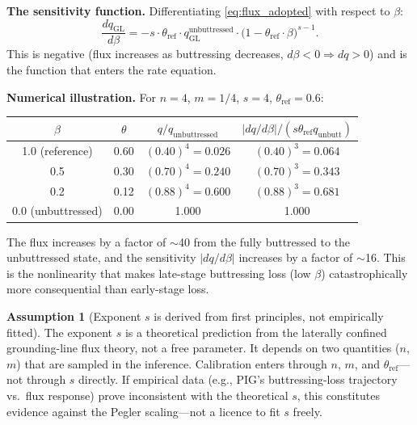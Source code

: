 \documentclass[11pt]{article}
\theoremstyle{definition}
\newtheorem{assumption}{Assumption}
\begin{document}
\textbf{The sensitivity function.}  Differentiating \cref{eq:flux_adopted} with respect to $\beta$:
\begin{equation}
  \frac{dq_{\text{GL}}}{d\beta} = -s \cdot \theta_{\text{ref}} \cdot q_\text{GL}^{\text{unbuttressed}} \cdot \bigl(1 - \theta_{\text{ref}} \cdot \beta\bigr)^{s - 1}.
  \label{eq:dq_dbeta}
\end{equation}
This is negative (flux increases as buttressing decreases, $d\beta < 0 \Rightarrow dq > 0$) and is the function that enters the rate equation.

\textbf{Numerical illustration.}  For $n = 4$, $m = 1/4$, $s = 4$, $\theta_{\text{ref}} = 0.6$:
\begin{center}
\begin{tabular}{cccc}
  \toprule
  $\beta$ & $\theta$ & $q/q_{\text{unbuttressed}}$ & $|dq/d\beta| / (s\theta_{\text{ref}} q_{\text{unbutt}})$ \\
  \midrule
  1.0 (reference) & 0.60 & $(0.40)^4 = 0.026$ & $(0.40)^3 = 0.064$ \\
  0.5 & 0.30 & $(0.70)^4 = 0.240$ & $(0.70)^3 = 0.343$ \\
  0.2 & 0.12 & $(0.88)^4 = 0.600$ & $(0.88)^3 = 0.681$ \\
  0.0 (unbuttressed) & 0.00 & 1.000 & 1.000 \\
  \bottomrule
\end{tabular}
\end{center}
The flux increases by a factor of $\sim$40 from the fully buttressed to the unbuttressed state, and the sensitivity $|dq/d\beta|$ increases by a factor of $\sim$16.  This is the nonlinearity that makes late-stage buttressing loss (low $\beta$) catastrophically more consequential than early-stage loss.

\begin{assumption}[Exponent $s$ is derived from first principles, not empirically fitted]
  \label{assump:s_theoretical}
  The exponent $s$ is a theoretical prediction from the laterally confined grounding-line flux theory, not a free parameter.  It depends on two quantities ($n$, $m$) that are sampled in the inference.  Calibration enters through $n$, $m$, and $\theta_{\text{ref}}$---not through $s$ directly.  If empirical data (e.g., PIG's buttressing-loss trajectory vs.\ flux response) prove inconsistent with the theoretical $s$, this constitutes evidence against the Pegler scaling---not a licence to fit $s$ freely.
\end{assumption}


\end{document}
